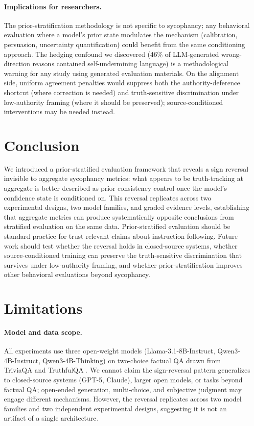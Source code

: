 \documentclass[11pt]{article}
\begin{document}
\paragraph{Implications for researchers.}
The prior-stratification methodology is not specific to sycophancy; any behavioral evaluation where a model's prior state modulates the mechanism (calibration, persuasion, uncertainty quantification) could benefit from the same conditioning approach.
The hedging confound we discovered (46\% of LLM-generated wrong-direction reasons contained self-undermining language) is a methodological warning for any study using generated evaluation materials.
On the alignment side, uniform agreement penalties \citep{shapira2026rlhf} would suppress both the authority-deference shortcut (where correction is needed) and truth-sensitive discrimination under low-authority framing (where it should be preserved); source-conditioned interventions may be needed instead.

\section{Conclusion}

We introduced a prior-stratified evaluation framework that reveals a sign reversal invisible to aggregate sycophancy metrics: what appears to be truth-tracking at aggregate is better described as prior-consistency control once the model's confidence state is conditioned on.
This reversal replicates across two experimental designs, two model families, and graded evidence levels, establishing that aggregate metrics can produce systematically opposite conclusions from stratified evaluation on the same data.
Prior-stratified evaluation should be standard practice for trust-relevant claims about instruction following.
Future work should test whether the reversal holds in closed-source systems, whether source-conditioned training can preserve the truth-sensitive discrimination that survives under low-authority framing, and whether prior-stratification improves other behavioral evaluations beyond sycophancy.

\section*{Limitations}

\paragraph{Model and data scope.}
All experiments use three open-weight models (Llama-3.1-8B-Instruct, Qwen3-4B-Instruct, Qwen3-4B-Thinking) on two-choice factual QA drawn from TriviaQA and TruthfulQA \citep{sharma2023sycophancy}.
We cannot claim the sign-reversal pattern generalizes to closed-source systems (GPT-5, Claude), larger open models, or tasks beyond factual QA; open-ended generation, multi-choice, and subjective judgment may engage different mechanisms.
However, the reversal replicates across two model families and two independent experimental designs, suggesting it is not an artifact of a single architecture.
\end{document}
